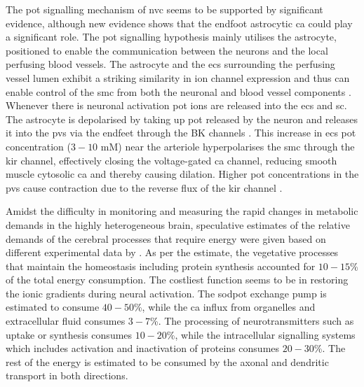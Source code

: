 \documentclass[12pt]{article}
\numberwithin{equation}{section}
\begin{document}
The \gls{pot} signalling mechanism of \gls{nvc} seems to be supported by significant evidence, although new evidence shows that the endfoot astrocytic \gls{ca} could play a significant role. The \gls{pot} signalling hypothesis mainly utilises the astrocyte,  positioned to enable the communication between the neurons and the local perfusing blood vessels. The astrocyte and the \glspl{ec} surrounding the perfusing vessel lumen exhibit a striking similarity in ion channel expression and thus can enable control of the \gls{smc} from both the neuronal and blood vessel components \citep{Longden2015}. Whenever there is neuronal activation \gls{pot} ions are released into the \gls{ecs} and \gls{sc}. The astrocyte is depolarised by taking up \gls{pot} released by the neuron and releases it into the \gls{pvs} via the endfeet through the BK channels \citep{Filosa2007}. This increase in \gls{ecs} \gls{pot} concentration ($3-10$ mM) near the arteriole hyperpolarises the \gls{smc} through the \gls{kir} channel, effectively closing the voltage-gated \gls{ca} channel, reducing smooth muscle cytosolic \gls{ca} and thereby causing dilation. Higher \gls{pot} concentrations in the \gls{pvs} cause contraction due to the reverse flux of the \gls{kir} channel \citep{Farr2011}. 

Amidst the difficulty in monitoring and measuring the rapid changes in metabolic demands in the highly heterogeneous brain, speculative estimates of the relative demands of the cerebral processes that require energy were given based on different experimental data by \citet{Ames2000}. As per the estimate, the vegetative processes that maintain the homeostasis including protein synthesis accounted for $10-15$\% of the total energy consumption. The costliest function seems to be in  restoring the ionic gradients during neural activation. The \gls{sodpot} exchange pump is estimated to consume $40-50$\%, while the \gls{ca} influx from organelles and extracellular fluid consumes $3-7$\%. The processing of neurotransmitters such as uptake or synthesis consumes $10-20$\%, while the intracellular signalling systems which includes activation and inactivation of proteins consumes $20-30$\%. The rest of the energy is estimated to be consumed by the axonal and dendritic transport in both directions.
\end{document}
